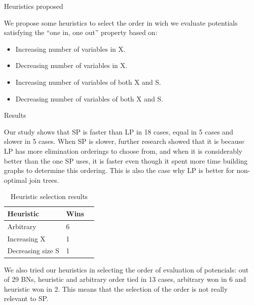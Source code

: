 \documentclass[final]{beamer}
\newlength{\onecolwid}
\newlength{\twocolwid}
\begin{document}
\begin{frame}[t]
\begin{columns}[t]
\begin{column}{\twocolwid}
\begin{columns}[t,totalwidth=\twocolwid]
\begin{column}{\onecolwid}

\begin{block}{Heuristics proposed}

We propose some heuristics to select the order in wich we evaluate potentials satisfying the “one in, one out” property based on:

\begin{itemize}

\item Increasing number of variables in X.
\item Decreasing number of variables in X.
\item Increasing number of variables of both X and S.
\item Decreasing number of variables of both X and S.

\end{itemize}

\end{block}

\begin{block}{Results}

Our study shows that SP is faster than LP in 18 cases, equal in 5 cases and slower in 5 cases. When SP is slower, further research showed that it is because LP has more elimination orderings to choose from, and when it is considerably better than the one SP uses, it is faster even though it spent more time building graphs to determine this ordering. This is also the case why LP is better for non-optimal join trees.

\begin{table}
\vspace{2ex}
\begin{tabular}{l l l}
\toprule
\textbf{Heuristic} & \textbf{Wins} \\
\midrule
Arbitrary & 6 \\
Increasing X & 1 \\
Decreasing size S & 1 \\
\bottomrule
\end{tabular}
\caption{Heuristic selection results}
\end{table}

We also tried our heuristics in selecting the order of evaluation of potencials: out of 29 BNs, heuristic and arbitrary order tied in 13 cases, arbitrary won in 6 and heuristic won in 2. This means that the selection of the order is not really relevant to SP.


\end{block}
\end{column}
\end{columns}
\end{column}
\end{columns}
\end{frame}
\end{document}
